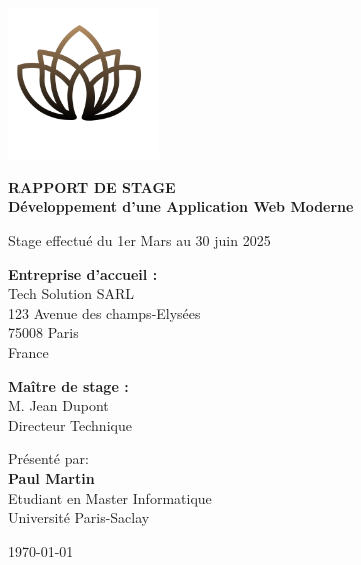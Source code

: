 \begin{titlepage}
	\centering
	\includegraphics[width=0.3\textwidth]{images/logo-universite.png}
	\vspace{1cm}
	
	{\Large \textbf{RAPPORT DE STAGE}}\\
	\vspace{1cm}
	{\huge \textbf{Développement d'une Application Web Moderne}}\\
	\vspace{1cm}
	
	{\Large Stage effectué du 1er Mars au 30 juin 2025}\\
	\vspace{2cm}
	
	\begin{minipage}{0.4\textwidth}
		\begin{flushleft}
			\textbf{Entreprise d'accueil :}\\
			Tech Solution SARL\\
			123 Avenue des champs-Elysées\\
			75008 Paris\\
			France
		\end{flushleft}
	\end{minipage}
	\hfill
	\begin{minipage}{0.4\textwidth}
		\begin{flushright}
			\textbf{Maître de stage :}\\
			M. Jean Dupont\\
			Directeur Technique
		\end{flushright}
	\end{minipage}
	
	
	\vspace{2cm}
	
	{\large Présenté par:}\\
	\vspace{0.5cm}
	{\Large \textbf{Paul Martin}}\\
	\vspace{0.5cm}
	{\large Etudiant en Master Informatique}\\
	{\large Université Paris-Saclay}\\
	
	\vspace{1cm}
	
	{\large \today}
\end{titlepage}